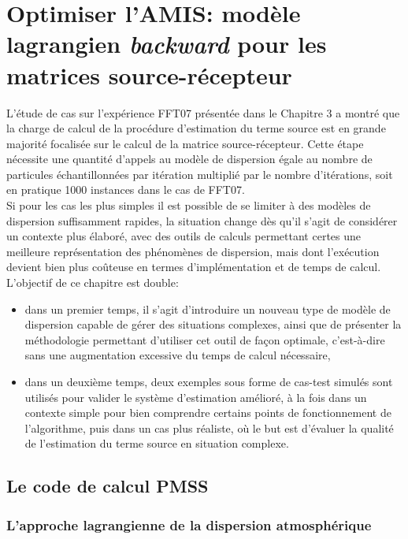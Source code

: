 \chapter{Optimiser l'AMIS: modèle lagrangien \textit{backward} pour les matrices source-récepteur}

L'étude de cas sur l'expérience FFT07 présentée dans le Chapitre 3 a montré que la charge de calcul de la procédure d'estimation du terme source est en grande majorité focalisée sur le calcul de la matrice source-récepteur. Cette étape nécessite une quantité d'appels au modèle de dispersion égale au nombre de particules échantillonnées par itération multiplié par le nombre d'itérations, soit en pratique 1000 instances dans le cas de FFT07. \\

Si pour les cas les plus simples il est possible de se limiter à des modèles de dispersion suffisamment rapides, la situation change dès qu'il s'agit de considérer un contexte plus élaboré, avec des outils de calculs permettant certes une meilleure représentation des phénomènes de dispersion, mais dont l'exécution devient bien plus coûteuse en termes d'implémentation et de temps de calcul. \\

L'objectif de ce chapitre est double: 
\begin{itemize}
	\item dans un premier temps, il s'agit d'introduire un nouveau type de modèle de dispersion capable de gérer des situations complexes, ainsi que de présenter la méthodologie permettant d'utiliser cet outil de façon optimale, c'est-à-dire sans une augmentation excessive du temps de calcul nécessaire,
	\item dans un deuxième temps, deux exemples sous forme de cas-test simulés sont utilisés pour valider le système d'estimation amélioré, à la fois dans un contexte simple pour bien comprendre certains points de fonctionnement de l'algorithme, puis dans un cas plus réaliste, où le but est d'évaluer la qualité de l'estimation du terme source en situation complexe.
\end{itemize}

\section{Le code de calcul PMSS}

\subsection{L'approche lagrangienne de la dispersion atmosphérique}
\label{part_lagrangian}

